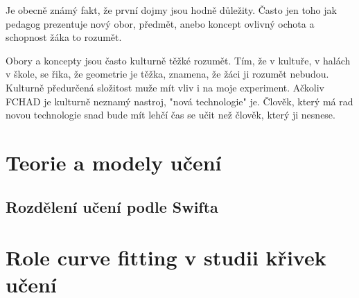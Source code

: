 Je obecně známý fakt, že první dojmy jsou hodně důležity.  Často jen toho jak pedagog prezentuje nový obor, předmět, anebo koncept ovlivný ochota a schopnost žáka to rozumět.

Obory a koncepty jsou často kulturně těžké rozumět.  Tím, že v kultuře, v halách v škole, se řika, že geometrie je těžka, znamena, že žáci ji rozumět nebudou.  Kulturně předurčená složitost muže mít vliv i na moje experiment. Ačkoliv FCHAD je kulturně neznamý nastroj, "nová technologie" je.  Člověk, který má rad novou technologie snad bude mít lehčí čas se učit než člověk, který ji nesnese.

\section{Teorie a modely učení}

\subsection{Rozdělení učení podle Swifta}

\section{Role curve fitting v studii křivek učení}
